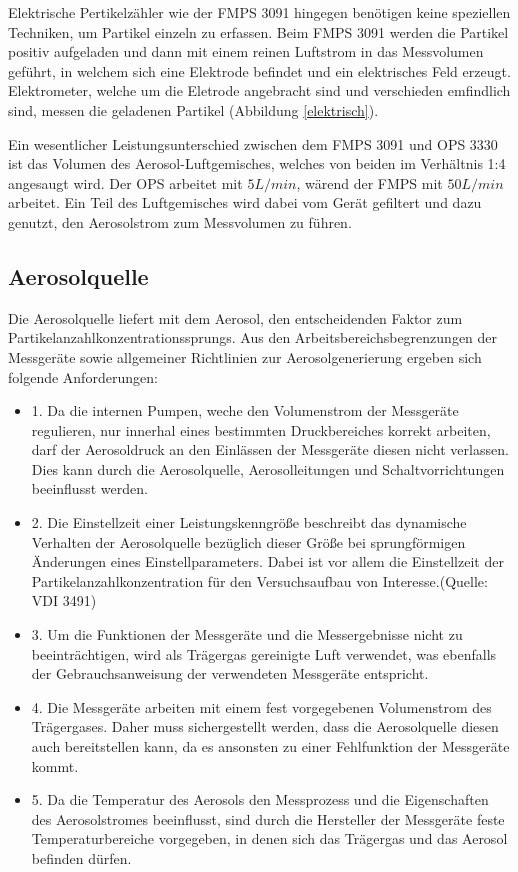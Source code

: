 Elektrische Pertikelz\"{a}hler wie der FMPS 3091 hingegen ben\"{o}tigen keine speziellen Techniken, um Partikel einzeln zu erfassen. Beim FMPS 3091 werden die Partikel positiv aufgeladen und dann mit einem reinen Luftstrom in das Messvolumen gef\"{u}hrt, in welchem sich eine Elektrode befindet und ein elektrisches Feld erzeugt. Elektrometer, welche um die Eletrode angebracht sind und verschieden emfindlich sind, messen die geladenen Partikel (Abbildung \ref{elektrisch}).

Ein wesentlicher Leistungsunterschied zwischen dem FMPS 3091 und OPS 3330 ist das Volumen des Aerosol-Luftgemisches, welches von beiden im Verh\"{a}ltnis 1:4 angesaugt wird. Der OPS arbeitet mit $5 L/min$, w\"{a}rend der FMPS mit $50 L/min$ arbeitet. Ein Teil des Luftgemisches wird dabei vom Ger\"{a}t gefiltert und dazu genutzt, den Aerosolstrom zum Messvolumen zu f\"{u}hren.     

\subsection{Aerosolquelle}
Die Aerosolquelle liefert mit dem Aerosol, den entscheidenden Faktor zum Partikelanzahlkonzentrationssprungs. Aus den Arbeitsbereichsbegrenzungen der Messger\"{a}te sowie allgemeiner Richtlinien zur Aerosolgenerierung ergeben sich folgende Anforderungen:

\begin{itemize}
\item 1. Da die internen Pumpen, weche den Volumenstrom der Messger\"{a}te regulieren, nur innerhal eines bestimmten Druckbereiches korrekt arbeiten, darf der Aerosoldruck an den Einl\"{a}ssen der Messger\"{a}te diesen nicht verlassen. Dies kann durch die Aerosolquelle, Aerosolleitungen und Schaltvorrichtungen beeinflusst werden. 

\item 2. Die Einstellzeit einer Leistungskenngr\"{o}{\ss}e beschreibt das dynamische Verhalten der Aerosolquelle bez\"{u}glich dieser Gr\"{o}{\ss}e bei sprungf\"{o}rmigen \"{A}nderungen eines Einstellparameters. Dabei ist vor allem die Einstellzeit der Partikelanzahlkonzentration für den Versuchsaufbau von Interesse.(Quelle: VDI 3491)

\item 3. Um die Funktionen der Messger\"{a}te und die Messergebnisse nicht zu beeintr\"{a}chtigen, wird als Tr\"{a}gergas gereinigte Luft verwendet, was ebenfalls der Gebrauchsanweisung der verwendeten Messger\"{a}te entspricht. 

\item 4. Die Messger\"{a}te arbeiten mit einem fest vorgegebenen Volumenstrom des Tr\"{a}gergases. Daher muss sichergestellt werden, dass die Aerosolquelle diesen auch bereitstellen kann, da es ansonsten zu einer Fehlfunktion der Messger\"{a}te kommt. 

\item 5. Da die Temperatur des Aerosols den Messprozess und die Eigenschaften des Aerosolstromes beeinflusst, sind durch die Hersteller der Messger\"{a}te feste Temperaturbereiche vorgegeben, in denen sich das Tr\"{a}gergas und das Aerosol befinden d\"{u}rfen.  
\end{itemize}

